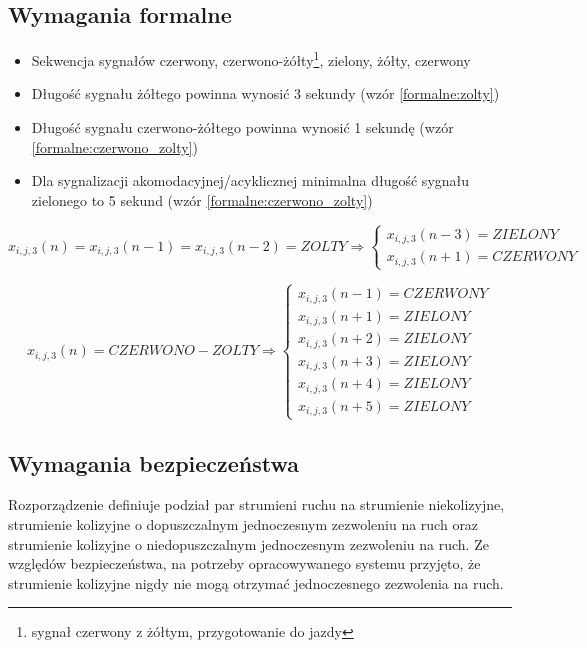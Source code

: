 \subsection{Wymagania formalne}
\begin{itemize}
	\item Sekwencja sygnałów czerwony, czerwono-żółty\footnote{sygnał czerwony z żółtym, przygotowanie do jazdy}, zielony, żółty, czerwony
	\item Długość sygnału żółtego powinna wynosić 3 sekundy (wzór \ref{formalne:zolty})
	\item Długość sygnału czerwono-żółtego powinna wynosić 1 sekundę (wzór \ref{formalne:czerwono_zolty})
	\item Dla sygnalizacji akomodacyjnej/acyklicznej minimalna długość sygnału zielonego to 5 sekund (wzór \ref{formalne:czerwono_zolty})
\end{itemize}

\begin{equation}
	\label{formalne:zolty}
	x_{i, j, 3} (n) = x_{i, j, 3} (n-1) = x_{i, j, 3} (n-2) = ZOLTY \Longrightarrow \left\{
	\begin{array}{c}
		x_{i, j, 3} (n-3) = ZIELONY\\
		x_{i, j, 3} (n+1) = CZERWONY
	\end{array}
\end{equation}

\begin{equation}
	\label{formalne:czerwono_zolty}
	x_{i, j, 3} (n) = CZERWONO-ZOLTY \Longrightarrow \left\{
	\begin{array}{c}
		x_{i, j, 3} (n-1) = CZERWONY\\
		x_{i, j, 3} (n+1) = ZIELONY\\
		x_{i, j, 3} (n+2) = ZIELONY\\
		x_{i, j, 3} (n+3) = ZIELONY\\
		x_{i, j, 3} (n+4) = ZIELONY\\
		x_{i, j, 3} (n+5) = ZIELONY
	\end{array}
\end{equation}

\subsection{Wymagania bezpieczeństwa}
Rozporządzenie definiuje podział par strumieni ruchu na strumienie niekolizyjne, strumienie kolizyjne o dopuszczalnym jednoczesnym zezwoleniu na ruch oraz strumienie kolizyjne o niedopuszczalnym jednoczesnym zezwoleniu na ruch. Ze względów bezpieczeństwa, na potrzeby opracowywanego systemu przyjęto, że strumienie kolizyjne nigdy nie mogą otrzymać jednoczesnego zezwolenia na ruch.

